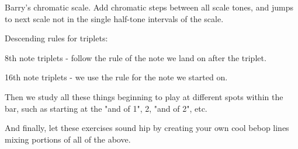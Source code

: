 \documentclass[a4paper,10pt,english]{article}
\begin{document}
\begin{todolist}
\begin{todolist}
    \end{todolist}
    \item Barry's chromatic scale. Add chromatic steps between all scale tones, and jumps to next scale not in the single half-tone intervals of the scale.
    \item Descending rules for triplets:
    \begin{todolist}
    \item 8th note triplets - follow the rule of the note we land on after the triplet.
    \item 16th note triplets - we use the rule for the note we started on.
    \end{todolist}
    \item Then we study all these things beginning to play at different spots within the bar, such as starting at the "and of 1", 2, "and of 2", etc.
    \item And finally, let these exercises sound hip by creating your own cool bebop lines mixing portions of all of the above.
  \end{todolist}
\end{document}
